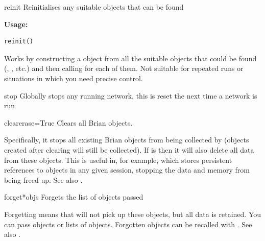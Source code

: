 \documentclass[letterpaper,10pt,english]{manual}
\begin{document}
\hypertarget{brian.reinit}{}\begin{funcdesc}{reinit}{}
Reinitialises any suitable objects that can be found

\textbf{Usage:}

\begin{Verbatim}[commandchars=@\[\]]
reinit()
\end{Verbatim}

Works by constructing a \hyperlink{brian.MagicNetwork}{} object from all the suitable
objects that could be found (\hyperlink{brian.NeuronGroup}{}, \hyperlink{brian.Connection}{}, etc.) and
then calling  for each of them. Not suitable for repeated
runs or situations in which you need precise control.
\end{funcdesc}

\hypertarget{brian.stop}{}\begin{funcdesc}{stop}{}
Globally stops any running network, this is reset the next time a network is run
\end{funcdesc}

\hypertarget{brian.clear}{}\begin{funcdesc}{clear}{erase=True}
Clears all Brian objects.

Specifically, it stops all existing Brian objects from being collected by
\hyperlink{brian.MagicNetwork}{} (objects created after clearing will still be collected).
If  is  then it will also delete all data from these objects.
This is useful in, for example,  which stores persistent references
to objects in any given session, stopping the data and memory from being freed
up.  See also \hyperlink{brian.forget}{}.
\end{funcdesc}

\hypertarget{brian.forget}{}\begin{funcdesc}{forget}{*objs}
Forgets the list of objects passed

Forgetting means that \hyperlink{brian.MagicNetwork}{} will not pick up these objects,
but all data is retained. You can pass objects or lists of objects. Forgotten
objects can be recalled with \hyperlink{brian.recall}{}. See also \hyperlink{brian.clear}{}.
\end{funcdesc}
\end{document}
